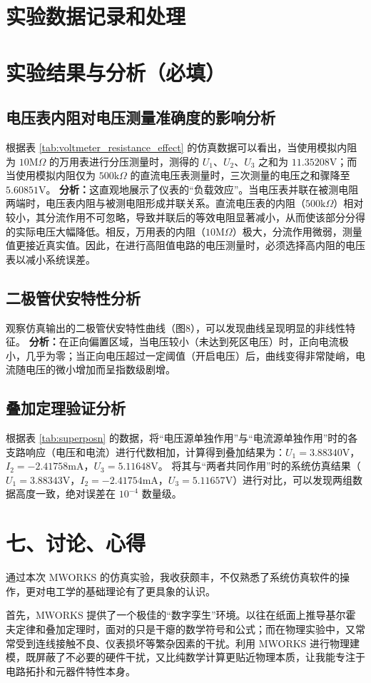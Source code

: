 \documentclass[10.5pt]{config}
\begin{document}
\section{实验数据记录和处理}

\section{实验结果与分析（必填）}

\subsection{电压表内阻对电压测量准确度的影响分析}
根据表 \ref{tab:voltmeter_resistance_effect} 的仿真数据可以看出，当使用模拟内阻为 $10\mathrm{M}\Omega$ 的万用表进行分压测量时，测得的 $U_1$、$U_2$、$U_3$ 之和为 $11.35208\mathrm{V}$；而当使用模拟内阻仅为 $500\mathrm{k}\Omega$ 的直流电压表测量时，三次测量的电压之和骤降至 $5.60851\mathrm{V}$。
\textbf{分析：}这直观地展示了仪表的“负载效应”。当电压表并联在被测电阻两端时，电压表内阻与被测电阻形成并联关系。直流电压表的内阻（$500\mathrm{k}\Omega$）相对较小，其分流作用不可忽略，导致并联后的等效电阻显著减小，从而使该部分分得的实际电压大幅降低。相反，万用表的内阻（$10\mathrm{M}\Omega$）极大，分流作用微弱，测量值更接近真实值。因此，在进行高阻值电路的电压测量时，必须选择高内阻的电压表以减小系统误差。

\subsection{二极管伏安特性分析}
观察仿真输出的二极管伏安特性曲线（图8），可以发现曲线呈现明显的非线性特征。
\textbf{分析：}在正向偏置区域，当电压较小（未达到死区电压）时，正向电流极小，几乎为零；当正向电压超过一定阈值（开启电压）后，曲线变得非常陡峭，电流随电压的微小增加而呈指数级剧增。

\subsection{叠加定理验证分析}
根据表 \ref{tab:superposn} 的数据，将“电压源单独作用”与“电流源单独作用”时的各支路响应（电压和电流）进行代数相加，计算得到叠加结果为：$U_1 = 3.88340\mathrm{V}$，$I_2 = -2.41758\mathrm{mA}$，$U_3 = 5.11648\mathrm{V}$。
将其与“两者共同作用”时的系统仿真结果（$U_1 = 3.88343\mathrm{V}$，$I_2 = -2.41754\mathrm{mA}$，$U_3 = 5.11657\mathrm{V}$）进行对比，可以发现两组数据高度一致，绝对误差在 $10^{-4}$ 数量级。

\section*{七、讨论、心得}

通过本次 MWORKS 的仿真实验，我收获颇丰，不仅熟悉了系统仿真软件的操作，更对电工学的基础理论有了更具象的认识。

首先，MWORKS 提供了一个极佳的“数字孪生”环境。以往在纸面上推导基尔霍夫定律和叠加定理时，面对的只是干瘪的数学符号和公式；而在物理实验中，又常常受到连线接触不良、仪表损坏等繁杂因素的干扰。利用 MWORKS 进行物理建模，既屏蔽了不必要的硬件干扰，又比纯数学计算更贴近物理本质，让我能专注于电路拓扑和元器件特性本身。
\end{document}
